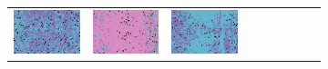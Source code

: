 \documentclass{ipol}
\begin{document}
\begin{figure}[ht]
\begin{subfigure}[t]{\linewidth}
\begin{tabular}{ccccccccc}
                \includegraphics[width=\s]{images/lake/DCB/iso_med_64_grids.png}&
                \includegraphics[width=\s]{images/lake/DHT/iso_med_64_grids.png}&
                \includegraphics[width=\s]{images/lake/LINEAR/iso_med_64_grids.png}&

\end{tabular}
\end{subfigure}
\end{figure}
\end{document}

